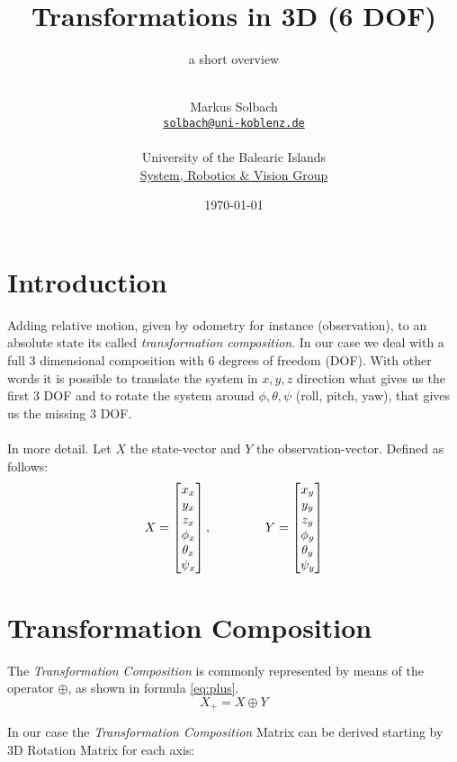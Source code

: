 \documentclass[10pt,a4paper]{scrartcl}
\author{\\Markus Solbach \\ \href{mailto:solbach@uni-koblenz.de}{\texttt{solbach@uni-koblenz.de}} \\\\  University of the Balearic Islands \\ \href{http://srv.uib.es/}{System, Robotics \& Vision Group} }
\date{\today}
\begin{document}
\title{Transformations in 3D (6 DOF)}
\subtitle{a short overview}
\maketitle\newpage

\section{Introduction}\label{ch:intro}
Adding relative motion, given by odometry for instance (observation), to an absolute state its called \textit{transformation composition}. In our case we deal with a full 3 dimensional composition with 6 degrees of freedom (DOF). With other words it is possible to translate the system in $x, y, z$ direction what gives us the first 3 DOF and to rotate the system around $\phi, \theta, \psi$ (roll, pitch, yaw), that gives us the missing 3 DOF.
\\\\ In more detail. Let $X$ the state-vector and $Y$ the observation-vector. Defined as follows:
\begin{equation}
X = \begin{bmatrix} x_x \\ y_x \\ z_x \\ \phi_x \\ \theta_x \\ \psi_x \end{bmatrix}, \hspace{15 mm} Y = \begin{bmatrix} x_y \\ y_y \\ z_y \\ \phi_y \\ \theta_y \\ \psi_y \end{bmatrix}
\end{equation}


\section{Transformation Composition}
The \textit{Transformation Composition} is commonly represented by means of the operator $\oplus$, as shown in formula \ref{eq:plus}.
\begin{equation}\label{eq:plus}
X_+ = X \oplus Y
\end{equation}

In our case the \textit{Transformation Composition} Matrix can be derived starting by 3D Rotation Matrix for each axis:
\end{document}
